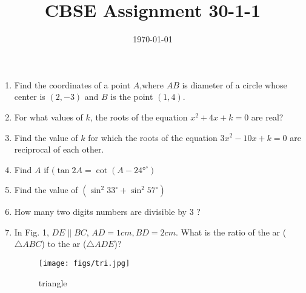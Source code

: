 \documentclass[12pt]{article}
\title{CBSE Assignment 30-1-1}
\date{\today}
\begin{document}
\maketitle{}
\begin{enumerate} 
\item Find the coordinates of a point $A$,where $AB$ is diameter of a circle whose center is $(2,-3)$ and $B$ is the point $(1,4)$.
\item For what values of $k$, the roots of the equation  $  x^2+4x+k = 0  $ are real?


\item Find the value of $k$ for which the roots of the equation  $ 3x^2-10x+k=0  $ are reciprocal of each other.
\item Find $A$ if $(\tan 2A = \cot (A-24°^\circ)$
\item Find the value of $(\sin^2 33^\circ + \sin^2 57^\circ)$
\item How many two digits numbers are divisible by 3 ?
\item In Fig. 1, $DE \parallel BC$, $ AD = 1 cm , BD = 2 cm$. What is the ratio of the ar ($\triangle ABC$) to  the 
  ar ($\triangle ADE$)?
		\begin{figure}[!ht]
			\centering
			\texttt{[image: figs/tri.jpg]}
			\caption{triangle}
			

\end{figure}
\end{enumerate}
\end{document}
